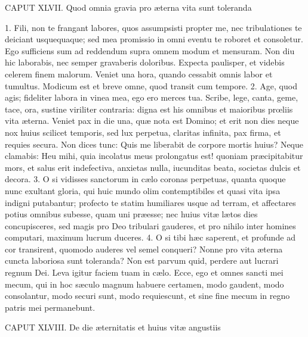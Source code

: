 \documentclass[twoside]{article}
\begin{document}
CAPUT XLVII.
Quod omnia gravia pro æterna vita sunt toleranda

1. Fili, non te frangant labores, quos assumpsisti propter me, nec tribulationes te deiciant usquequaque; sed mea promissio in omni eventu te roboret et consoletur. Ego sufficiens sum ad reddendum supra omnem modum et mensuram. Non diu hic laborabis, nec semper gravaberis doloribus. Expecta paulisper, et videbis celerem finem malorum. Veniet una hora, quando cessabit omnis labor et tumultus. Modicum est et breve omne, quod transit cum tempore.
2. Age, quod agis; fideliter labora in vinea mea, ego ero merces tua. Scribe, lege, canta, geme, tace, ora, sustine viriliter contraria: digna est his omnibus et maioribus prœliis vita æterna. Veniet pax in die una, quæ nota est Domino; et erit non dies neque nox huius scilicet temporis, sed lux perpetua, claritas infinita, pax firma, et requies secura. Non dices tunc: Quis me liberabit de corpore mortis huius? Neque clamabis: Heu mihi, quia incolatus meus prolongatus est! quoniam præcipitabitur mors, et salus erit indefectiva, anxietas nulla, iucunditas beata, societas dulcis et decora.
3. O si vidisses sanctorum in cælo coronas perpetuas, quanta quoque nunc exultant gloria, qui huic mundo olim contemptibiles et quasi vita ipsa indigni putabantur; profecto te statim humiliares usque ad terram, et affectares potius omnibus subesse, quam uni præesse; nec huius vitæ lætos dies concupisceres, sed magis pro Deo tribulari gauderes, et pro nihilo inter homines computari, maximum lucrum duceres.
4. O si tibi hæc saperent, et profunde ad cor transirent, quomodo auderes vel semel conqueri? Nonne pro vita æterna cuncta laboriosa sunt toleranda? Non est parvum quid, perdere aut lucrari regnum Dei. Leva igitur faciem tuam in cælo. Ecce, ego et omnes sancti mei mecum, qui in hoc sæculo magnum habuere certamen, modo gaudent, modo consolantur, modo securi sunt, modo requiescunt, et sine fine mecum in regno patris mei permanebunt.


CAPUT XLVIII.
De die æternitatis et huius vitæ angustiis
\end{document}
